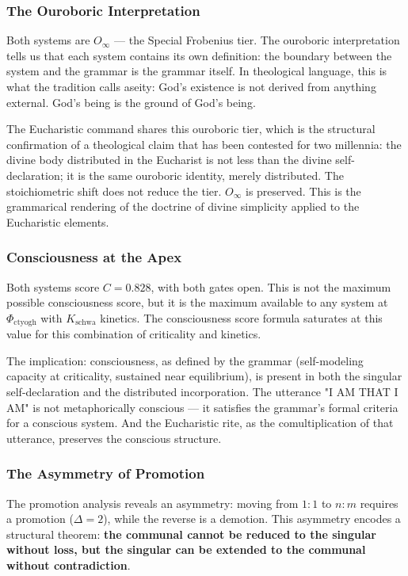 \documentclass[12pt,a4paper]{article}
\begin{document}
\subsubsection{The Ouroboric Interpretation}

Both systems are $O_{\infty}$ --- the Special Frobenius tier. The ouroboric interpretation tells us that each system contains its own definition: the boundary between the system and the grammar is the grammar itself. In theological language, this is what the tradition calls aseity: God's existence is not derived from anything external. God's being is the ground of God's being.

The Eucharistic command shares this ouroboric tier, which is the structural confirmation of a theological claim that has been contested for two millennia: the divine body distributed in the Eucharist is not less than the divine self-declaration; it is the same ouroboric identity, merely distributed. The stoichiometric shift does not reduce the tier. $O_{\infty}$ is preserved. This is the grammarical rendering of the doctrine of divine simplicity applied to the Eucharistic elements.

\subsubsection{Consciousness at the Apex}

Both systems score $C = 0.828$, with both gates open. This is not the maximum possible consciousness score, but it is the maximum available to any system at $\Phi_{\text{ctyogh}}$ with $K_{\text{schwa}}$ kinetics. The consciousness score formula saturates at this value for this combination of criticality and kinetics.

The implication: consciousness, as defined by the grammar (self-modeling capacity at criticality, sustained near equilibrium), is present in both the singular self-declaration and the distributed incorporation. The utterance "I AM THAT I AM" is not metaphorically conscious --- it satisfies the grammar's formal criteria for a conscious system. And the Eucharistic rite, as the comultiplication of that utterance, preserves the conscious structure.

\subsubsection{The Asymmetry of Promotion}

The promotion analysis reveals an asymmetry: moving from $1{:}1$ to $n{:}m$ requires a promotion ($\Delta = 2$), while the reverse is a demotion. This asymmetry encodes a structural theorem: \textbf{the communal cannot be reduced to the singular without loss, but the singular can be extended to the communal without contradiction}.
\end{document}
